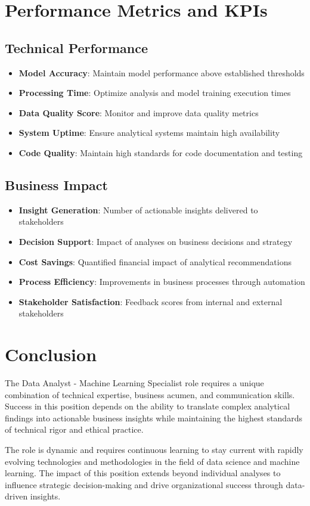 \documentclass[11pt,a4paper]{article}
\begin{document}
\section{Performance Metrics and KPIs}

\subsection{Technical Performance}
\begin{itemize}[leftmargin=*]
    \item \textbf{Model Accuracy}: Maintain model performance above established thresholds
    \item \textbf{Processing Time}: Optimize analysis and model training execution times
    \item \textbf{Data Quality Score}: Monitor and improve data quality metrics
    \item \textbf{System Uptime}: Ensure analytical systems maintain high availability
    \item \textbf{Code Quality}: Maintain high standards for code documentation and testing
\end{itemize}

\subsection{Business Impact}
\begin{itemize}[leftmargin=*]
    \item \textbf{Insight Generation}: Number of actionable insights delivered to stakeholders
    \item \textbf{Decision Support}: Impact of analyses on business decisions and strategy
    \item \textbf{Cost Savings}: Quantified financial impact of analytical recommendations
    \item \textbf{Process Efficiency}: Improvements in business processes through automation
    \item \textbf{Stakeholder Satisfaction}: Feedback scores from internal and external stakeholders
\end{itemize}

\section{Conclusion}

The Data Analyst - Machine Learning Specialist role requires a unique combination of technical expertise, business acumen, and communication skills. Success in this position depends on the ability to translate complex analytical findings into actionable business insights while maintaining the highest standards of technical rigor and ethical practice.

The role is dynamic and requires continuous learning to stay current with rapidly evolving technologies and methodologies in the field of data science and machine learning. The impact of this position extends beyond individual analyses to influence strategic decision-making and drive organizational success through data-driven insights.
\end{document}
